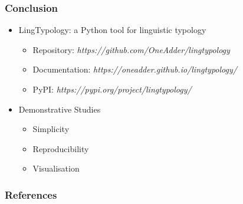 \documentclass{beamer}
\begin{document}
\begin{frame}
\frametitle{Conclusion}
\begin{itemize}
 \item LingTypology: a Python tool for linguistic typology
 \begin{itemize}
  \item Repository: \textit{https://github.com/OneAdder/lingtypology}
  \item Documentation: \textit{https://oneadder.github.io/lingtypology/}
  \item PyPI: \textit{https://pypi.org/project/lingtypology/}
 \end{itemize}
 \item Demonstrative Studies
 \begin{itemize}
  \item Simplicity
  \item Reproducibility
  \item Visualisation
 \end{itemize}
\end{itemize}

\end{frame}

\begin{frame}[allowframebreaks]
\frametitle{References}
\renewcommand*{\bibfont}{\tiny}
\printbibliography
\end{frame}
\end{document}
